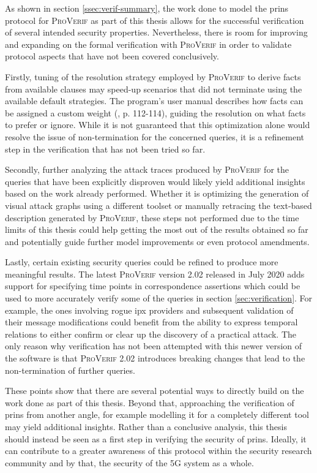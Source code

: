 As shown in section \ref{ssec:verif-summary}, the work done to model the \gls{prins} protocol for \textsc{ProVerif} as part of this thesis allows for the successful verification of several intended security properties.
Nevertheless, there is room for improving and expanding on the formal verification with \textsc{ProVerif} in order to validate protocol aspects that have not been covered conclusively.

Firstly, tuning of the resolution strategy employed by \textsc{ProVerif} to derive facts from available clauses may speed-up scenarios that did not terminate using the available default strategies.
The program's user manual describes how facts can be assigned a custom weight (\cite{blanchet2020proverif}, p. 112-114), guiding the resolution on what facts to prefer or ignore.
While it is not guaranteed that this optimization alone would resolve the issue of non-termination for the concerned queries, it is a refinement step in the verification that has not been tried so far.

Secondly, further analyzing the attack traces produced by \textsc{ProVerif} for the queries that have been explicitly disproven would likely yield additional insights based on the work already performed.
Whether it is optimizing the generation of visual attack graphs using a different toolset or manually retracing the text-based description generated by \textsc{ProVerif}, these steps not performed due to the time limits of this thesis could help getting the most out of the results obtained so far and potentially guide further model improvements or even protocol amendments.

Lastly, certain existing security queries could be refined to produce more meaningful results.
The latest \textsc{ProVerif} version 2.02 released in July 2020 adds support for specifying time points in correspondence assertions which could be used to more accurately verify some of the queries in section \ref{sec:verification}.
For example, the ones involving rogue \gls{ipx} providers and subsequent validation of their message modifications could benefit from the ability to express temporal relations to either confirm or clear up the discovery of a practical attack.
The only reason why verification has not been attempted with this newer version of the software is that \textsc{ProVerif} 2.02 introduces breaking changes that lead to the non-termination of further queries.

These points show that there are several potential ways to directly build on the work done as part of this thesis.
Beyond that, approaching the verification of \gls{prins} from another angle, for example modelling it for a completely different tool may yield additional insights.
Rather than a conclusive analysis, this thesis should instead be seen as a first step in verifying the security of \gls{prins}.
Ideally, it can contribute to a greater awareness of this protocol within the security research community and by that, the security of the 5G system as a whole.